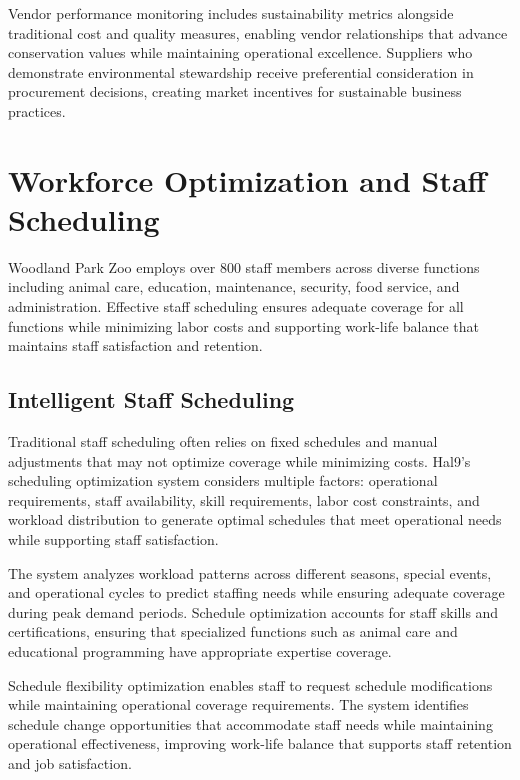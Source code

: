 \documentclass[
  Letterpaper,
]{scrbook}
\begin{document}
Vendor performance monitoring includes sustainability metrics alongside
traditional cost and quality measures, enabling vendor relationships
that advance conservation values while maintaining operational
excellence. Suppliers who demonstrate environmental stewardship receive
preferential consideration in procurement decisions, creating market
incentives for sustainable business practices.

\section{Workforce Optimization and Staff
Scheduling}\label{workforce-optimization-and-staff-scheduling}

Woodland Park Zoo employs over 800 staff members across diverse
functions including animal care, education, maintenance, security, food
service, and administration. Effective staff scheduling ensures adequate
coverage for all functions while minimizing labor costs and supporting
work-life balance that maintains staff satisfaction and retention.

\subsection{Intelligent Staff
Scheduling}\label{intelligent-staff-scheduling}

Traditional staff scheduling often relies on fixed schedules and manual
adjustments that may not optimize coverage while minimizing costs.
Hal9's scheduling optimization system considers multiple factors:
operational requirements, staff availability, skill requirements, labor
cost constraints, and workload distribution to generate optimal
schedules that meet operational needs while supporting staff
satisfaction.

The system analyzes workload patterns across different seasons, special
events, and operational cycles to predict staffing needs while ensuring
adequate coverage during peak demand periods. Schedule optimization
accounts for staff skills and certifications, ensuring that specialized
functions such as animal care and educational programming have
appropriate expertise coverage.

Schedule flexibility optimization enables staff to request schedule
modifications while maintaining operational coverage requirements. The
system identifies schedule change opportunities that accommodate staff
needs while maintaining operational effectiveness, improving work-life
balance that supports staff retention and job satisfaction.
\end{document}
